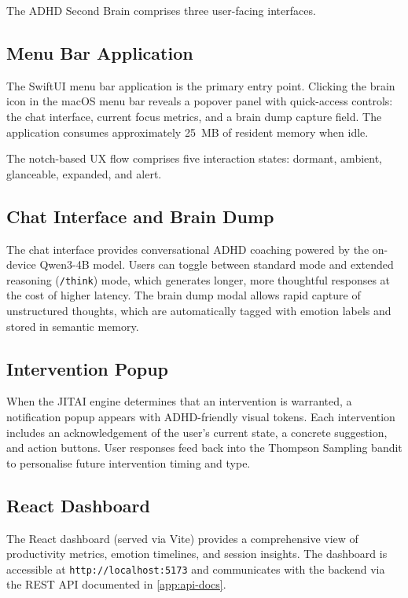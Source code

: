The ADHD Second Brain comprises three user-facing interfaces.

\subsection{Menu Bar Application}

The SwiftUI menu bar application is the primary entry point. Clicking the brain icon in the macOS menu bar reveals a popover panel with quick-access controls: the chat interface, current focus metrics, and a brain dump capture field. The application consumes approximately 25~MB of resident memory when idle.

The notch-based UX flow comprises five interaction states: dormant, ambient, glanceable, expanded, and alert.

\subsection{Chat Interface and Brain Dump}

The chat interface provides conversational ADHD coaching powered by the on-device Qwen3-4B model. Users can toggle between standard mode and extended reasoning (\texttt{/think}) mode, which generates longer, more thoughtful responses at the cost of higher latency. The brain dump modal allows rapid capture of unstructured thoughts, which are automatically tagged with emotion labels and stored in semantic memory.

\subsection{Intervention Popup}

When the JITAI engine determines that an intervention is warranted, a notification popup appears with ADHD-friendly visual tokens. Each intervention includes an acknowledgement of the user's current state, a concrete suggestion, and action buttons. User responses feed back into the Thompson Sampling bandit to personalise future intervention timing and type.

\subsection{React Dashboard}

The React dashboard (served via Vite) provides a comprehensive view of productivity metrics, emotion timelines, and session insights. The dashboard is accessible at \texttt{http://localhost:5173} and communicates with the backend via the REST API documented in \cref{app:api-docs}.

